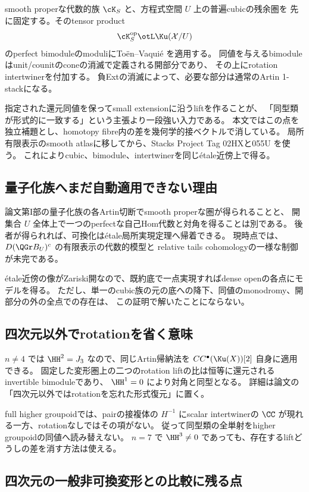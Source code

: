 smooth properな代数的族 \(\cK_S\) と、方程式空間 \(U\) 上の普遍cubicの残余圏を
先に固定する。そのtensor product
\[
 \cK_S^{\mathrm{op}}\otL\Ku(\mathcal X/U)
\]
のperfect bimoduleのmoduliにToën--Vaquié \cite{TV} を適用する。
同値を与えるbimoduleはunit/counitのconeの消滅で定義される開部分であり、
その上にrotation intertwinerを付加する。
負Extの消滅によって、必要な部分は通常のArtin 1-stackになる。

指定された還元同値を保ってsmall extensionに沿うliftを作ることが、
「同型類が形式的に一致する」という主張より一段強い入力である。
本文ではこの点を独立補題とし、homotopy fibre内の差を幾何学的接ベクトルで消している。
局所有限表示のsmooth atlasに移してから、Stacks Project Tag 02HXと055U \cite{Stacks}を使う。
これによりcubic、bimodule、intertwinerを同じétale近傍上で得る。

\subsection{量子化族へまだ自動適用できない理由}

論文第I部の量子化族の各Artin切断でsmooth properな圏が得られることと、
開集合 \(U\) 全体上で一つのperfectな自己Hom代数と対角を得ることは別である。
後者が得られれば、可換化はétale局所実現定理へ帰着できる。
現時点では、\(D(\QGr B_U)^c\) の有限表示の代数的模型と
relative tails cohomologyの一様な制御が未完である。

étale近傍の像がZariski開なので、既約底で一点実現すればdense openの各点にモデルを得る。
ただし、単一のcubic族の元の底への降下、同値のmonodromy、開部分の外の全点での存在は、
この証明で解いたことにならない。

\subsection{四次元以外でrotationを省く意味}

\(n\ne4\) では \(\HH^2=J_3\) なので、同じArtin帰納法を
\(CC^\bullet(\Ku(X))[2]\) 自身に適用できる。
固定した変形圏上の二つのrotation liftの比は恒等に還元されるinvertible bimoduleであり、
\(\HH^1=0\) により対角と同型となる。
詳細は論文の「四次元以外ではrotationを忘れた形式復元」に置く。

full higher groupoidでは、pairの接複体の \(H^{-1}\) にscalar intertwinerの
\(\CC\) が現れる一方、rotationなしではその項がない。
従って同型類の全単射をhigher groupoidの同値へ読み替えない。
\(n=7\) で \(\HH^3\ne0\) であっても、存在するliftどうしの差を消す方法は使える。

\subsection{四次元の一般非可換変形との比較に残る点}

